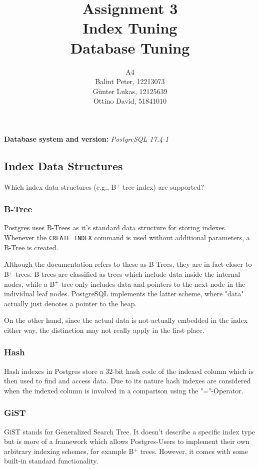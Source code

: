 \documentclass[11pt]{scrartcl}
\title{
  \textbf{\large Assignment 3} \\
  Index Tuning \\
  {\large Database Tuning}}
\author{
  A4 \\
  \large Balint Peter, 12213073 \\
  \large Günter Lukas, 12125639 \\
  \large Ottino David, 51841010
}
\begin{document}
\maketitle

\textbf{Database system and version:} \emph{PostgreSQL 17.4-1}

\subsection{Index Data Structures}

Which index data structures (e.g., B$^+$ tree index) are supported?

\subsubsection{B-Tree}
Postgres uses B-Trees as it's standard data structure for storing indexes. Whenever the \texttt{CREATE INDEX} command is used without additional parameters, a B-Tree is created.

Although the documentation refers to these as B-Trees, they are in fact closer to B$^+$-trees. B-trees are classified as trees which include data inside the internal nodes, while a B$^+$-tree only includes data and pointers to the next node in the individual leaf nodes.  PostgreSQL implements the latter scheme, where "data" actually just denotes a pointer to the heap.

On the other hand, since the actual data is not actually embedded in the index either way, the distinction may not really apply in the first place. 

\subsubsection{Hash}
Hash indexes in Postgres store a 32-bit hash code of the indexed column which is then used to find and access data. Due to its nature hash indexes are considered when the indexed column is involved in a comparison using the "="-Operator.

\subsubsection{GiST}
GiST stands for Generalized Search Tree. It doesn't describe a specific index type but is more of a framework which allows Postgres-Users to implement their own arbitrary indexing schemes, for example B$^+$ trees. However, it comes with some built-in standard functionality.
\end{document}
